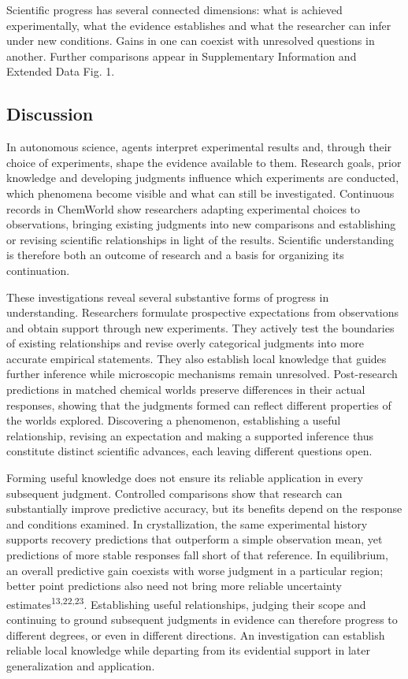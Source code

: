 \documentclass[12pt,a4paper]{article}
\begin{document}
Scientific progress has several connected dimensions: what is achieved experimentally, what the evidence establishes and what the researcher can infer under new conditions. Gains in one can coexist with unresolved questions in another. Further comparisons appear in Supplementary Information and Extended Data Fig. 1.

\FloatBarrier
\subsection{Discussion}\label{discussion}

In autonomous science, agents interpret experimental results and, through their choice of experiments, shape the evidence available to them. Research goals, prior knowledge and developing judgments influence which experiments are conducted, which phenomena become visible and what can still be investigated. Continuous records in ChemWorld show researchers adapting experimental choices to observations, bringing existing judgments into new comparisons and establishing or revising scientific relationships in light of the results. Scientific understanding is therefore both an outcome of research and a basis for organizing its continuation.

These investigations reveal several substantive forms of progress in understanding. Researchers formulate prospective expectations from observations and obtain support through new experiments. They actively test the boundaries of existing relationships and revise overly categorical judgments into more accurate empirical statements. They also establish local knowledge that guides further inference while microscopic mechanisms remain unresolved. Post-research predictions in matched chemical worlds preserve differences in their actual responses, showing that the judgments formed can reflect different properties of the worlds explored. Discovering a phenomenon, establishing a useful relationship, revising an expectation and making a supported inference thus constitute distinct scientific advances, each leaving different questions open.

Forming useful knowledge does not ensure its reliable application in every subsequent judgment. Controlled comparisons show that research can substantially improve predictive accuracy, but its benefits depend on the response and conditions examined. In crystallization, the same experimental history supports recovery predictions that outperform a simple observation mean, yet predictions of more stable responses fall short of that reference. In equilibrium, an overall predictive gain coexists with worse judgment in a particular region; better point predictions also need not bring more reliable uncertainty estimates\textsuperscript{13,22,23}. Establishing useful relationships, judging their scope and continuing to ground subsequent judgments in evidence can therefore progress to different degrees, or even in different directions. An investigation can establish reliable local knowledge while departing from its evidential support in later generalization and application.
\end{document}
